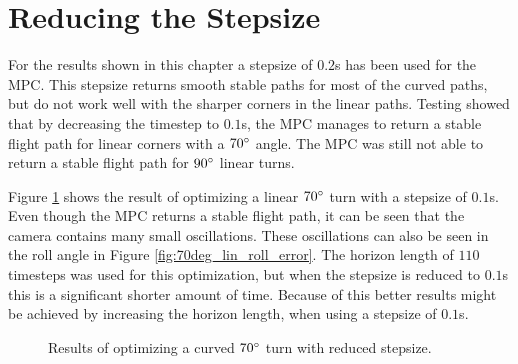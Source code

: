 \section{Reducing the Stepsize}
\label{sec:reducing_stepsize}

For the results shown in this chapter a stepsize of $0.2$s has been used for the MPC. This stepsize returns smooth stable paths for most of the curved paths, but do not work well with the sharper corners in the linear paths. Testing showed that by decreasing the timestep to $0.1$s, the MPC manages to return a stable flight path for linear corners with a $70\degree$ angle. The MPC was still not able to return a stable flight path for $90\degree$ linear turns.

Figure \ref{fig:70deg_lin_error} shows the result of optimizing a linear $70\degree$ turn with a stepsize of $0.1$s. Even though the MPC returns a stable flight path, it can be seen that the camera contains many small oscillations. These oscillations can also be seen in the roll angle in Figure \ref{fig:70deg_lin_roll_error}. The horizon length of $110$ timesteps was used for this optimization, but when the stepsize is reduced to $0.1$s this is a significant shorter amount of time. Because of this better results might be achieved by increasing the horizon length, when using a stepsize of $0.1$s.

\begin{figure}
	\caption{Results of optimizing a curved $70\degree$ turn with reduced stepsize.}
	\label{fig:70deg_lin_error}
\end{figure}